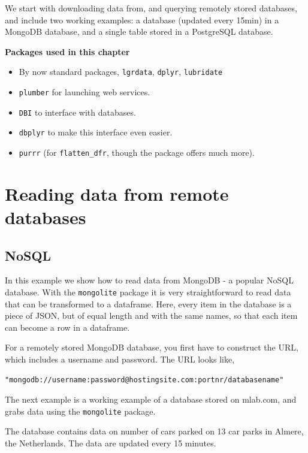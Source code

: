 \documentclass[]{book}
\providecommand{\tightlist}{%
  \setlength{\itemsep}{0pt}\setlength{\parskip}{0pt}}
\begin{document}
We start with downloading data from, and querying remotely stored databases, and include two working examples: a database (updated every 15min) in a MongoDB database, and a single table stored in a PostgreSQL database.

\textbf{Packages used in this chapter}

\begin{itemize}
\tightlist
\item
  By now standard packages, \texttt{lgrdata}, \texttt{dplyr}, \texttt{lubridate}
\item
  \texttt{plumber} for launching web services.
\item
  \texttt{DBI} to interface with databases.
\item
  \texttt{dbplyr} to make this interface even easier.
\item
  \texttt{purrr} (for \texttt{flatten\_dfr}, though the package offers much more).
\end{itemize}

\hypertarget{reading-data-from-remote-databases}{%
\section{Reading data from remote databases}\label{reading-data-from-remote-databases}}

\hypertarget{nosql}{%
\subsection{NoSQL}\label{nosql}}

In this example we show how to read data from MongoDB - a popular NoSQL database. With the \texttt{mongolite} package it is very straightforward to read data that can be transformed to a dataframe. Here, every item in the database is a piece of JSON, but of equal length and with the same names, so that each item can become a row in a dataframe.

For a remotely stored MongoDB database, you first have to construct the URL, which includes a username and password. The URL looks like,

\begin{verbatim}
"mongodb://username:password@hostingsite.com:portnr/databasename"
\end{verbatim}

The next example is a working example of a database stored on mlab.com, and grabs data using the \texttt{mongolite} package.

The database contains data on number of cars parked on 13 car parks in Almere, the Netherlands. The data are updated every 15 minutes.
\end{document}
